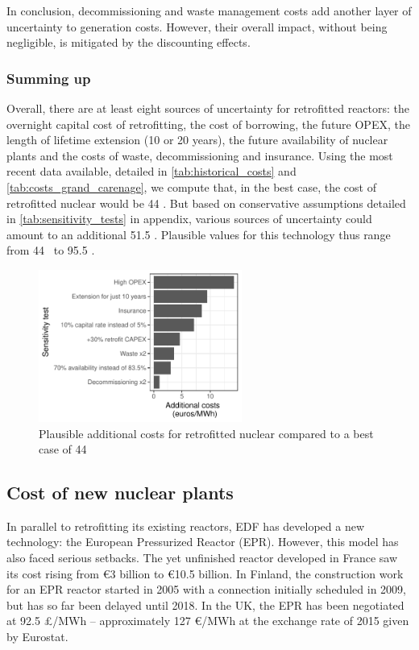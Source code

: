 In conclusion, decommissioning and waste management costs add another layer of uncertainty to generation costs. However, their overall impact, without being negligible, is mitigated by the discounting effects.


\subsubsection{Summing up}
Overall, there are at least eight sources of uncertainty for retrofitted reactors: the overnight capital cost of retrofitting, the cost of borrowing, the future OPEX, the length of lifetime extension (10 or 20 years), the future availability of nuclear plants and the costs of waste, decommissioning and insurance.
Using the most recent data available, detailed in \cref{tab:historical_costs} and \cref{tab:costs_grand_carenage}, we compute that, in the best case, the cost of retrofitted nuclear would be 44 \emwh. But based on conservative assumptions detailed in \cref{tab:sensitivity_tests} in appendix, various sources of uncertainty could amount to an additional 51.5 \emwh. Plausible values for this technology thus range from 44 \emwh\ to 95.5 \emwh.


\begin{figure}[!ht]
	\centering
	\includegraphics[height=5cm]{figures/sensitivity_tests.pdf}
	\caption{Plausible additional costs for retrofitted nuclear compared to a best case of 44 \emwh}
	\label{fig:sensitivity_tests}
\end{figure}

\subsection{Cost of new nuclear plants}

In parallel to retrofitting its existing reactors, EDF has developed a new technology: the European Pressurized Reactor (EPR).
However, this model has also faced serious setbacks.
The yet unfinished reactor developed in France saw its cost rising from \euro 3 billion to \euro 10.5 billion.
In Finland, the construction work for an EPR reactor started in 2005 with a connection initially scheduled in 2009, but has so far been delayed until 2018.
In the UK, the EPR has been negotiated at 92.5 \pounds/MWh -- approximately 127 \euro/MWh at the exchange rate of 2015 given by Eurostat.


